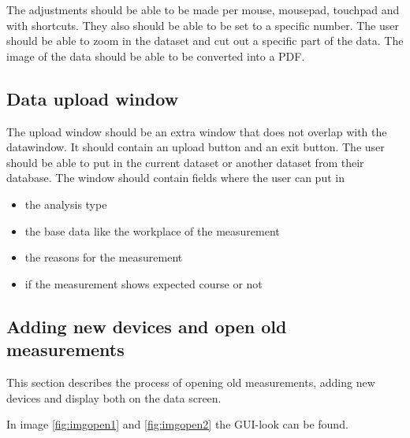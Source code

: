 \documentclass{scrreprt}
\begin{document}
The adjustments should be able to be made per mouse, mousepad, touchpad and with shortcuts. They also should be able to be set to a specific number. 
The user should be able to zoom in the dataset and cut out a specific part of the data. The image of the data should be able to be converted into a PDF. 

\subsection{Data upload window}

The upload window should be an extra window that does not overlap with the datawindow. It should contain an upload button and an exit button. The user should be able to put in the 
current dataset or another dataset from their database. 
The window should contain fields where the user can put in 
\begin{itemize}
    \item the analysis type
    \item the base data like the workplace of the measurement
    \item the reasons for the measurement
    \item if the measurement shows expected course or not 
\end{itemize}


\subsection{Adding new devices and open old measurements}
This section describes the process of opening old measurements, adding new devices and display both on the data screen. 

In image \ref{fig:imgopen1} and \ref{fig:imgopen2} the GUI-look can be found. 
\end{document}
